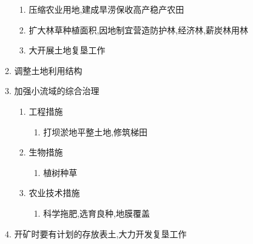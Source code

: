 \documentclass[a4paper]{article}
\begin{document}
\begin{enumerate}
\begin{enumerate}
            \begin{enumerate}
                \item 压缩农业用地,建成旱涝保收高产稳产农田
                \item 扩大林草种植面积,因地制宜营造防护林,经济林,薪炭林用林
                \item 大开展土地复垦工作
            \end{enumerate}
            \item 调整土地利用结构
            \item 加强小流域的综合治理
            \begin{enumerate} %
                \item 工程措施
                \begin{enumerate}
                    \item 打坝淤地平整土地,修筑梯田
                \end{enumerate}
                \item 生物措施
                \begin{enumerate}
                    \item 植树种草
                \end{enumerate}
                \item 农业技术措施
                \begin{enumerate}
                    \item 科学拖肥,选育良种,地膜覆盖
                \end{enumerate}
            \end{enumerate}
            \item 开矿时要有计划的存放表土,大力开发复垦工作
        \end{enumerate}
    \end{enumerate}
\end{document}
